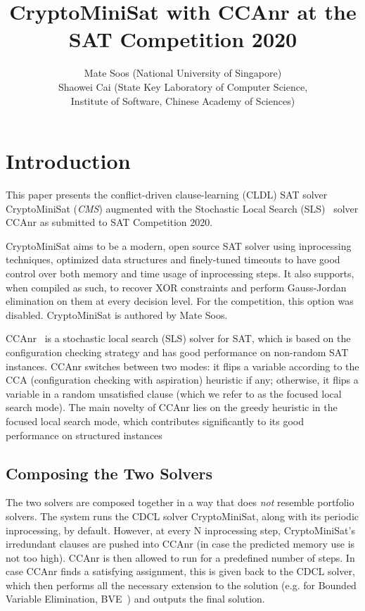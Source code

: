 \documentclass[final]{ieee}
\begin{document}
\title{CryptoMiniSat with CCAnr at the SAT Competition 2020}
\author{Mate Soos (National University of Singapore)\\
Shaowei Cai (State Key Laboratory of Computer Science,\\Institute of Software, Chinese Academy of Sciences)}

\maketitle
\thispagestyle{empty}
\pagestyle{empty}

\section{Introduction}
This paper presents the conflict-driven clause-learning (CLDL) SAT solver CryptoMiniSat (\emph{CMS}) augmented with the Stochastic Local Search (SLS)~\cite{DBLP:conf/sat/CaiLS15} solver CCAnr as submitted to SAT Competition 2020.

CryptoMiniSat aims to be a modern, open source SAT solver using inprocessing techniques, optimized data structures and finely-tuned timeouts to have good control over both memory and time usage of inprocessing steps. It also supports, when compiled as such, to recover XOR constraints and perform Gauss-Jordan elimination on them at every decision level. For the competition, this option was disabled. CryptoMiniSat is authored by Mate Soos.

CCAnr~\cite{DBLP:conf/sat/CaiLS15} is a stochastic local search (SLS) solver for SAT, which is based on the configuration checking strategy and has good performance on non-random SAT instances. CCAnr switches between two modes: it flips a variable according to the CCA (configuration checking with aspiration) heuristic if any; otherwise, it flips a variable in a random unsatisfied clause (which we refer to as the focused local search mode). The main novelty of CCAnr lies on the greedy heuristic in the focused local search mode, which contributes significantly to its good performance on structured instances

\subsection{Composing the Two Solvers}
The two solvers are composed together in a way that does \emph{not} resemble portfolio solvers. The system runs the CDCL solver CryptoMiniSat, along with its periodic inprocessing, by default. However, at every N inprocessing step, CryptoMiniSat's irredundant clauses are pushed into CCAnr (in case the predicted memory use is not too high). CCAnr is then allowed to run for a predefined number of steps. In case CCAnr finds a satisfying assignment, this is given back to the CDCL solver, which then performs all the necessary extension to the solution (e.g. for Bounded Variable Elimination, BVE~\cite{BVE}) and outputs the final solution.
\end{document}
